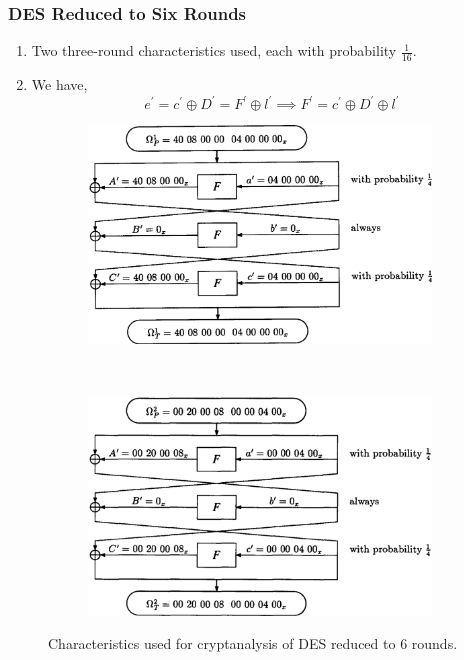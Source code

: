 \documentclass{beamer}
\begin{document}
	\begin{frame}
		\frametitle{DES Reduced to Six Rounds}
		\begin{enumerate}
			\item Two three-round characteristics used, each with probability
			\(\frac{1}{16}\).
			\item<2-> We have,
			\begin{equation}
				e^\prime = c^\prime \oplus D^\prime = F^\prime \oplus l^\prime \implies F^\prime = c^\prime \oplus D^\prime \oplus l^\prime
			\end{equation}
		\end{enumerate}
		\begin{figure}[!ht]
		    \centering
		    \begin{subfigure}{0.4\linewidth}
		        \includegraphics[width=\columnwidth]{images/des_6round_char1.png}
		    \end{subfigure}
			~
		    \begin{subfigure}{0.4\linewidth}
		        \includegraphics[width=\columnwidth]{images/des_6round_char2.png}
		    \end{subfigure}
		    \caption{Characteristics used for cryptanalysis of DES reduced to 6 rounds.}
		    \label{fig:des-6-char}
		\end{figure}
	\end{frame}
\end{document}
